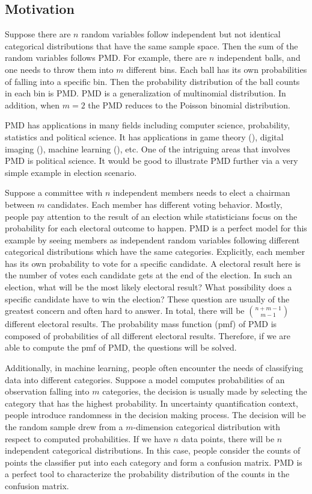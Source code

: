 \documentclass[12pt]{article}
\newcommand{\PMD}{\textrm{PMD}}
\begin{document}
\subsection{Motivation}

Suppose there are $n$ random variables follow independent but not identical categorical distributions that have the same sample space. Then the sum of the random variables follows $\PMD$. For example, there are $n$ independent balls, and one needs to throw them into $m$ different bins. Each ball has its own probabilities of falling into a specific bin. Then the probability distribution of the ball counts in each bin is $\PMD$. $\PMD$ is a generalization of multinomial distribution. In addition, when $m=2$ the $\PMD$ reduces to the Poisson binomial distribution.

$\PMD$ has applications in many fields including computer science, probability, statistics and political science. It has applications in game theory (), digital imaging (), machine learning (), etc. One of the intriguing areas that involves $\PMD$ is political science. It would be good to illustrate $\PMD$ further via a very simple example in election scenario. 

Suppose a committee with $n$  independent members needs to elect a chairman between $m$ candidates. Each member has different voting behavior. Mostly, people pay attention to the result of an election while statisticians focus on the probability for each electoral outcome to happen. $\PMD$ is a perfect model for this example by seeing members as independent random variables following different categorical distributions which have the same categories. Explicitly,  each member has its own probability to vote for a specific candidate. A electoral result here is the number of votes each candidate gets at the end of the election. In such an election, what will be the most likely electoral result? What possibility does a specific candidate have to win the election? These question are usually of the greatest concern and often hard to answer. In total, there will be $\binom{n+m-1}{m-1}$ different electoral results. The probability mass function (pmf) of $\PMD$ is composed of probabilities of all different electoral results. Therefore, if we are able to compute the pmf of $\PMD$, the questions will be solved.

Additionally, in machine learning, people often encounter the needs of classifying data into different categories. Suppose a model computes probabilities of an observation falling into $m$ categories, the decision is usually made by selecting the category that has the highest probability. In uncertainty quantification context, people introduce randomness in the decision making process.  The decision will be the random sample drew from a $m$-dimension categorical distribution with respect to computed probabilities. If we have $n$ data points, there will be $n$ independent categorical distributions. In this case, people consider the counts of points the classifier put into each category and form a confusion matrix. $\PMD$ is a perfect tool to characterize the probability distribution of the counts in the confusion matrix.
\end{document}
